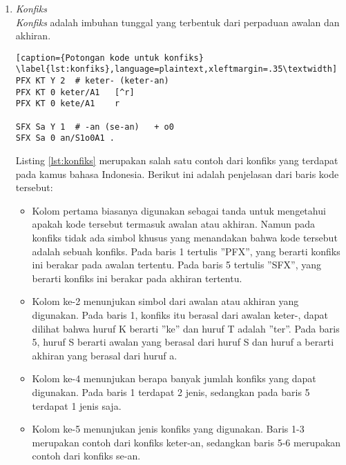 \begin{enumerate}
	\begin{itemize}
		\item SFX\\
		Menandakan bahwa kode tersebut merupakan akhiran
		
		\item k0\\
		Huruf k menunjukan akhiran yang dimulai dengan huruf k, dan angka 0 menunjukan bentuk akhiran asli
		
		\item 3\\
		Menandakan bahwa ada 3 jenis akhiran yang dapat digunakan, yaitu -kan, -kanlah dan -kankah
		
		\item -kan\\
		Menandakan bahwa kode tersebut merupakan akhiran -kan 
	\end{itemize}
	
	\item \textit{Konfiks} \\	
	\textit{Konfiks} adalah imbuhan tunggal yang terbentuk dari perpaduan awalan dan akhiran.
	
	\begin{lstlisting}[caption={Potongan kode untuk konfiks}			\label{lst:konfiks},language=plaintext,xleftmargin=.35\textwidth] 
PFX KT Y 2	# keter- (keter-an)
PFX KT 0 keter/A1	[^r]
PFX KT 0 kete/A1	r

SFX Sa Y 1	# -an (se-an) 	+ o0
SFX Sa 0 an/S1o0A1 . 
	\end{lstlisting}
	
	Listing \ref{lst:konfiks} merupakan salah satu contoh dari konfiks yang terdapat pada kamus bahasa
Indonesia. Berikut ini adalah penjelasan dari baris kode tersebut:
	
	\begin{itemize}
		\item Kolom pertama biasanya digunakan sebagai tanda untuk mengetahui apakah kode tersebut termasuk awalan atau akhiran. Namun pada konfiks tidak ada simbol khusus yang menandakan bahwa kode tersebut adalah sebuah konfiks. Pada baris 1 tertulis ”PFX”, yang berarti konfiks ini berakar pada awalan tertentu. Pada baris 5 tertulis ”SFX”, yang berarti konfiks ini berakar pada akhiran tertentu.
		
		\item Kolom ke-2 menunjukan simbol dari awalan atau akhiran yang digunakan. Pada baris 1, konfiks itu berasal dari awalan keter-, dapat dilihat bahwa huruf K berarti ”ke” dan huruf T adalah ”ter”. Pada baris 5, huruf S berarti awalan yang berasal dari huruf S dan huruf a berarti akhiran yang berasal dari huruf a.
		
		\item Kolom ke-4 menunjukan berapa banyak jumlah konfiks yang dapat digunakan. Pada baris 1 terdapat 2 jenis, sedangkan pada baris 5 terdapat 1 jenis saja.
		
		\item Kolom ke-5 menunjukan jenis konfiks yang digunakan. Baris 1-3 merupakan contoh dari konfiks keter-an, sedangkan baris 5-6 merupakan contoh dari konfiks se-an.
	\end{itemize}
	
\end{enumerate}